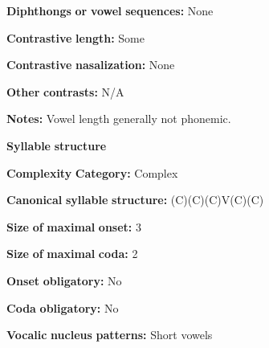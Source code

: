 \begin{styleBody}
\textbf{Diphthongs} \textbf{or} \textbf{vowel} \textbf{sequences:} None
\end{styleBody}

\begin{styleBody}
\textbf{Contrastive} \textbf{length:} Some
\end{styleBody}

\begin{styleBody}
\textbf{Contrastive} \textbf{nasalization:} None
\end{styleBody}

\begin{styleBody}
\textbf{Other} \textbf{contrasts:} N/A
\end{styleBody}

\begin{styleBody}
\textbf{Notes:} Vowel length generally not phonemic.
\end{styleBody}

\begin{styleBody}
\textbf{Syllable} \textbf{structure}
\end{styleBody}

\begin{styleBody}
\textbf{Complexity} \textbf{Category:} Complex
\end{styleBody}

\begin{styleBody}
\textbf{Canonical} \textbf{syllable} \textbf{structure:} (C)(C)(C)V(C)(C) \citep[23-6]{Rumsey1978}
\end{styleBody}

\begin{styleBody}
\textbf{Size} \textbf{of} \textbf{maximal} \textbf{onset:} 3
\end{styleBody}

\begin{styleBody}
\textbf{Size} \textbf{of} \textbf{maximal} \textbf{coda:} 2
\end{styleBody}

\begin{styleBody}
\textbf{Onset} \textbf{obligatory:} No
\end{styleBody}

\begin{styleBody}
\textbf{Coda} \textbf{obligatory:} No
\end{styleBody}

\begin{styleBody}
\textbf{Vocalic} \textbf{nucleus} \textbf{patterns:} Short vowels
\end{styleBody}

